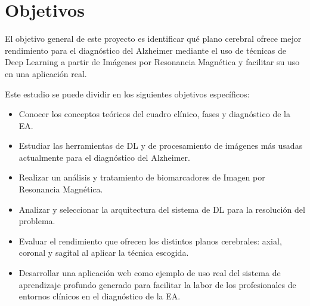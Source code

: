 \section{Objetivos}\label{sec:objetivos}
El objetivo general de este proyecto es identificar qué plano cerebral ofrece mejor rendimiento para el diagnóstico del
Alzheimer mediante el uso de técnicas de Deep Learning a partir de Imágenes por Resonancia Magnética y facilitar su uso
en una aplicación real.

Este estudio se puede dividir en los siguientes objetivos específicos:
\begin{itemize}
    \item Conocer los conceptos teóricos del cuadro clínico, fases y diagnóstico de la EA.
    \item Estudiar las herramientas de DL y de procesamiento de imágenes más usadas actualmente para el diagnóstico del
    Alzheimer.
    \item Realizar un análisis y tratamiento de biomarcadores de Imagen por Resonancia Magnética.
    \item Analizar y seleccionar la arquitectura del sistema de DL para la resolución del problema.
    \item Evaluar el rendimiento que ofrecen los distintos planos cerebrales: axial, coronal y sagital al aplicar la
    técnica escogida.
    \item Desarrollar una aplicación web como ejemplo de uso real del sistema de aprendizaje profundo generado para
    facilitar la labor de los profesionales de entornos clínicos en el diagnóstico de la EA.\\
\end{itemize}


%
%